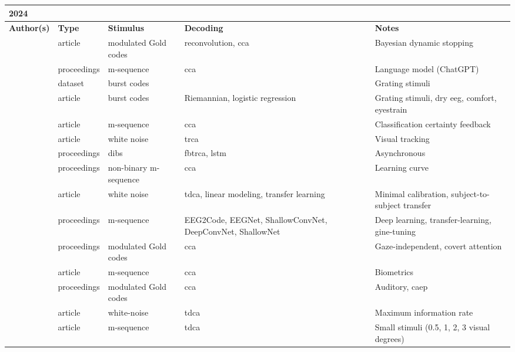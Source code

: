 \documentclass[a4paper,landscape]{article}
\begin{document}
\begin{table}[H]
	\begin{tabular}{p{5cm}p{2cm}p{5cm}p{5cm}p{6.5cm}}
		\textbf{2024} & & & & \\ 
		\toprule
		\textbf{Author(s)} & \textbf{Type} & \textbf{Stimulus} & \textbf{Decoding} & \textbf{Notes} \\ 
		\midrule
		\citeauthor{ahmadi2024} & article & modulated Gold codes & reconvolution, \acrshort{cca} & Bayesian dynamic stopping \\
		\citeauthor{canturk2024} & proceedings & m-sequence & \acrshort{cca} & Language model (ChatGPT) \\
		\citeauthor{castillos2024dataset} & dataset & burst codes & & Grating stimuli \\
		\citeauthor{dehais2024} & article & burst codes & Riemannian, logistic regression & Grating stimuli, dry \acrshort{eeg}, comfort, eyestrain \\
		\citeauthor{fodor2024} & article & m-sequence & \acrshort{cca} & Classification certainty feedback \\
		\citeauthor{huang2024} & article & white noise & \acrshort{trca} & Visual tracking \\
		\citeauthor{lai2024} & proceedings & \acrshort{dibs} & \acrfull{fbtrca}, \acrshort{lstm} & Asynchronous \\
		\citeauthor{martinez2024} & proceedings & non-binary m-sequence & \acrshort{cca} & Learning curve \\
		\citeauthor{miao2024a} & article & white noise & \acrshort{tdca}, linear modeling, transfer learning & Minimal calibration, subject-to-subject transfer \\
		\citeauthor{miao2024b} & proceedings & m-sequence & EEG2Code, EEGNet, ShallowConvNet, DeepConvNet, ShallowNet & Deep learning, transfer-learning, gine-tuning \\
		\citeauthor{narayanan2024} & proceedings & modulated Gold codes & \acrshort{cca} & Gaze-independent, covert attention \\
		\citeauthor{qu2024} & article & m-sequence & \acrshort{cca} & Biometrics \\
		\citeauthor{scheppink2024} & proceedings & modulated Gold codes & \acrshort{cca} & Auditory, \acrshort{caep} \\
		\citeauthor{shi2024} & article & white-noise & \acrshort{tdca} & Maximum information rate \\
		\citeauthor{sun2024} & article & m-sequence & \acrshort{tdca} & Small stimuli (0.5, 1, 2, 3 visual degrees) \\

\end{tabular}
\end{table}
\end{document}
